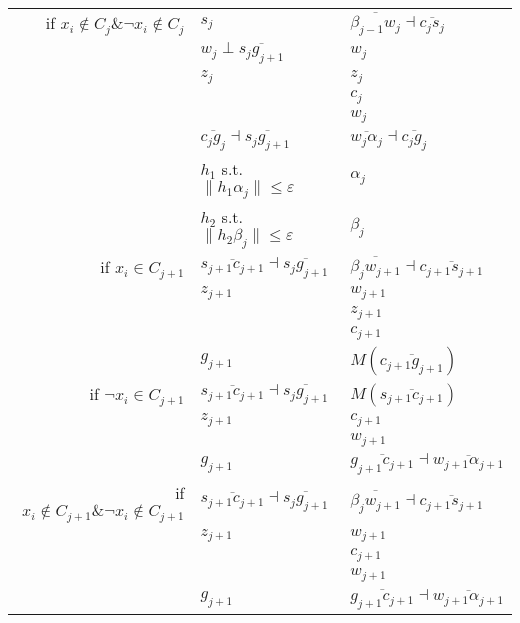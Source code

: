 \documentclass[12pt]{dalthesis}
\def\favoritefont{\bfseries \sffamily}
\def\QED{\ensuremath{{\Box}}}
\def\markatright#1{\leavevmode\unskip\nobreak\quad\hspace*{\fill}{#1}}
\newenvironment{proof}
	{\begin{trivlist}\item[\hskip\labelsep{\favoritefont Proof:}]}
	{\markatright{\QED}\end{trivlist}}
\newcommand{\eps}{\varepsilon}
\newcommand{\Seg}[1]{{\overline{#1}}}
\begin{document}
\begin{proof}
\begin{table}[t]
\begin{tabular}{ r | l | l  }
   if $x_i \notin C_j \& \neg x_i \notin C_j$  & $s_j$ & $\Seg{\beta_{j-1}w_j}	\dashv \Seg{c_js_j}$\\
	&$w_j \perp \Seg{s_jg_{j+1}}$  & $w_j$\\
	&$z_j$  & $z_j$\\

	& &$c_j$\\
	& &$w_j$\\
& $\Seg{c_jg_j} \dashv \Seg{s_jg_{j+1}} $ & $\Seg{w_{j}\alpha_{j}} \dashv \Seg{c_{j}g_{j}}$ \\

\hline
	&  $h_1$ s.t.  $\| h_1\alpha_j \| \le \eps$ & $\alpha_j$\\
	&  	$h_2$ s.t.  $\| h_2 \beta_j \| \le \eps$ & $\beta_j$\\





\hline
if $x_i \in C_{j+1}$ &  $\Seg{s_{j+1}c_{j+1}}	\dashv \Seg{s_{j}g_{j+1}}$    & $\Seg{\beta_jw_{j+1}}	\dashv \Seg{c_{j+1}s_{j+1}}$\\
& $z_{j+1}$ & $w_{j+1}$\\
&  & $z_{j+1}$\\
&  & $c_{j+1}$ \\
&  $g_{j+1}$ & $M(\Seg{c_{j+1}g_{j+1}})$\\




if $\neg x_i \in C_{j+1}$ &  			$\Seg{s_{j+1}c_{j+1}}	\dashv \Seg{s_{j}g_{j+1}}$  & $M(\Seg{s_{j+1}c_{j+1}})$\\
 & $z_{j+1}$ & $c_{j+1}$ \\
 &  & $w_{j+1}$ \\
 &  $g_{j+1}$ & $\Seg{g_{j+1}c_{j+1}}	\dashv \Seg{w_{j+1}\alpha_{j+1}}$ \\






if $x_i \notin C_{j+1} \& \neg x_i \notin C_{j+1}$ &  	$\Seg{s_{j+1}c_{j+1}}	\dashv \Seg{s_{j}g_{j+1}}$  & $\Seg{\beta_jw_{j+1}}	\dashv \Seg{c_{j+1}s_{j+1}}$\\
& $z_{j+1}$ & $w_{j+1}$\\
 & & $c_{j+1}$ \\
 & & $w_{j+1}$ \\
&  $g_{j+1}$ & $\Seg{g_{j+1}c_{j+1}}	\dashv \Seg{w_{j+1}\alpha_{j+1}}$ \\






\end{tabular}
\end{table}
\end{proof}
\end{document}
